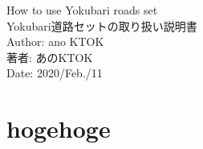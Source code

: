 \documentclass[11pt,a4paper]{jsarticle}
\begin{document}
\begin{flushleft}

  { \fontsize{24pt}{0pt}\selectfont
    How to use Yokubari roads set
  }
	\\
\vspace{3pt}
	{ \fontsize{12pt}{0pt}\selectfont
		Yokubari道路セットの取り扱い説明書
	}
	\\
\vspace{15pt}
	{ \fontsize{18pt}{0pt}\selectfont
		Author: ano KTOK
	}
	\\
\vspace{2pt}
	{ \fontsize{12pt}{0pt}\selectfont
		著者: あのKTOK
	}
	\\
\vspace{15pt}
	{ \fontsize{12pt}{0pt}\selectfont
		Date: 2020/Feb./11
	}
\end{flushleft}

\newpage

\tableofcontents

\section{hogehoge}
\end{document}
